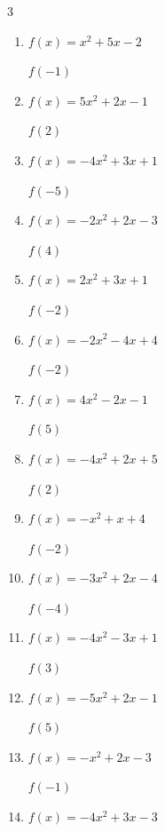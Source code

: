 \begin{multicols}{3}
\begin{enumerate}
$f(-2)$
        \phantom{$= -1$}

  \item $f(x)=x^{2}+5x-2$

$f(-1)$
        \phantom{$= -6$}

  \item $f(x)=5x^{2}+2x-1$

$f(2)$
        \phantom{$= 23$}

  \item $f(x)=-4x^{2}+3x+1$

$f(-5)$
        \phantom{$= -114$}

  \item $f(x)=-2x^{2}+2x-3$

$f(4)$
        \phantom{$= -27$}

\columnbreak %

\resetques

  \item $f(x)=2x^{2}+3x+1$

$f(-2)$
        \phantom{$= 3$}

  \item $f(x)=-2x^{2}-4x+4$

$f(-2)$
        \phantom{$= 4$}

  \item $f(x)=4x^{2}-2x-1$

$f(5)$
        \phantom{$= 89$}

  \item $f(x)=-4x^{2}+2x+5$

$f(2)$
        \phantom{$= -7$}

  \item $f(x)=-x^{2}+x+4$

$f(-2)$
        \phantom{$= -2$}

  \item $f(x)=-3x^{2}+2x-4$

$f(-4)$
        \phantom{$= -60$}

  \item $f(x)=-4x^{2}-3x+1$

$f(3)$
        \phantom{$= -44$}

  \item $f(x)=-5x^{2}+2x-1$

$f(5)$
        \phantom{$= -116$}

  \item $f(x)=-x^{2}+2x-3$

$f(-1)$
        \phantom{$= -6$}

  \item $f(x)=-4x^{2}+3x-3$


\end{enumerate}
\end{multicols}
